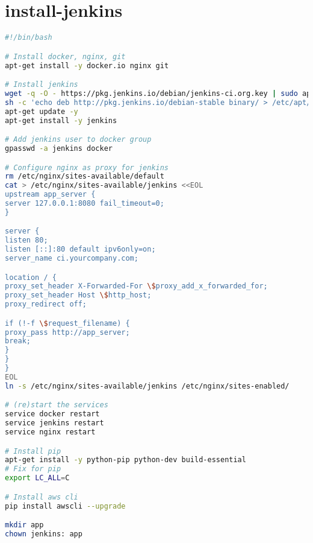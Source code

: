 \section{install-jenkins} \label{install-jenkins}

\begin{lstlisting}[language=bash]
#!/bin/bash

# Install docker, nginx, git
apt-get install -y docker.io nginx git

# Install jenkins
wget -q -O - https://pkg.jenkins.io/debian/jenkins-ci.org.key | sudo apt-key add -
sh -c 'echo deb http://pkg.jenkins.io/debian-stable binary/ > /etc/apt/sources.list.d/jenkins.list'
apt-get update -y
apt-get install -y jenkins

# Add jenkins user to docker group
gpasswd -a jenkins docker

# Configure nginx as proxy for jenkins
rm /etc/nginx/sites-available/default
cat > /etc/nginx/sites-available/jenkins <<EOL
upstream app_server {
server 127.0.0.1:8080 fail_timeout=0;
}

server {
listen 80;
listen [::]:80 default ipv6only=on;
server_name ci.yourcompany.com;

location / {
proxy_set_header X-Forwarded-For \$proxy_add_x_forwarded_for;
proxy_set_header Host \$http_host;
proxy_redirect off;

if (!-f \$request_filename) {
proxy_pass http://app_server;
break;
}
}
}
EOL
ln -s /etc/nginx/sites-available/jenkins /etc/nginx/sites-enabled/

# (re)start the services
service docker restart
service jenkins restart
service nginx restart

# Install pip
apt-get install -y python-pip python-dev build-essential
# Fix for pip
export LC_ALL=C

# Install aws cli
pip install awscli --upgrade

mkdir app
chown jenkins: app
\end{lstlisting}